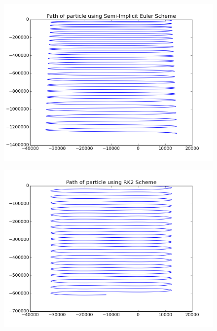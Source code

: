 \documentclass[11pt, a4paper]{article}
\begin{document}
\begin{figure}[H]
 \centering
 \includegraphics[width = \textwidth]{q4_euler2.png}
\end{figure}
\begin{figure}[H]
 \centering
 \includegraphics[width = \textwidth]{q4_RK2.png}
\end{figure}
\end{document}
